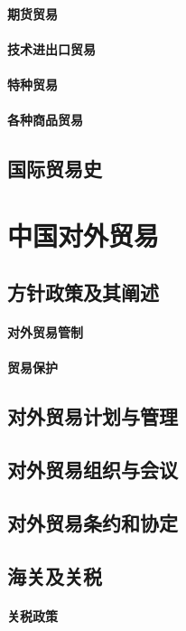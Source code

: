 \documentclass[UTF8]{../../RepresentationUniverse}
\begin{document}
    \subsubsection{期货贸易}
    \subsubsection{技术进出口贸易}
    \subsubsection{特种贸易}
    \subsubsection{各种商品贸易}
\section{国际贸易史}





\chapter{中国对外贸易}
\section{方针政策及其阐述}
    \subsubsection{对外贸易管制}
    \subsubsection{贸易保护}
\section{对外贸易计划与管理}
\section{对外贸易组织与会议}
\section{对外贸易条约和协定}
\section{海关及关税}
    \subsubsection{关税政策}
\end{document}
